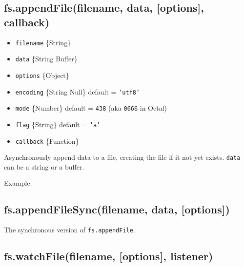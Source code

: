 \subsection{fs.appendFile(filename, data, {[}options{]}, callback)}

\begin{itemize}
\item
  \texttt{filename} \{String\}
\item
  \texttt{data} \{String \textbar{} Buffer\}
\item
  \texttt{options} \{Object\}
\item
  \texttt{encoding} \{String \textbar{} Null\} default = \texttt{'utf8'}
\item
  \texttt{mode} \{Number\} default = \texttt{438} (aka \texttt{0666} in
  Octal)
\item
  \texttt{flag} \{String\} default = \texttt{'a'}
\item
  \texttt{callback} \{Function\}
\end{itemize}

Asynchronously append data to a file, creating the file if it not yet
exists. \texttt{data} can be a string or a buffer.

Example:

\begin{Shaded}
\begin{Highlighting}[]
\NormalTok{(}\NormalTok{, }\NormalTok{, } 
    
  \NormalTok{(}\NormalTok{);}
\NormalTok{\});}
\end{Highlighting}
\end{Shaded}

\subsection{fs.appendFileSync(filename, data, {[}options{]})}

The synchronous version of \texttt{fs.appendFile}.

\subsection{fs.watchFile(filename, {[}options{]}, listener)}

\begin{Shaded}
\begin{Highlighting}[]
\NormalTok{: } \NormalTok{- }  
\end{Highlighting}
\end{Shaded}

